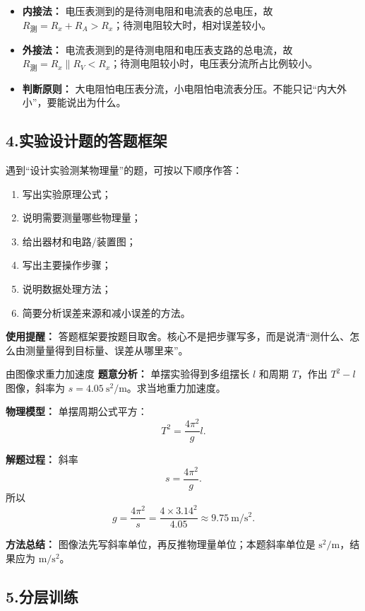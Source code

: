 \begin{itemize}
  \item \textbf{内接法：} 电压表测到的是待测电阻和电流表的总电压，故 $R_{\text{测}}=R_x+R_A>R_x$；待测电阻较大时，相对误差较小。
  \item \textbf{外接法：} 电流表测到的是待测电阻和电压表支路的总电流，故 $R_{\text{测}}=R_x\parallel R_V<R_x$；待测电阻较小时，电压表分流所占比例较小。
  \item \textbf{判断原则：} 大电阻怕电压表分流，小电阻怕电流表分压。不能只记“内大外小”，要能说出为什么。
\end{itemize}

\subsection*{4.\quad 实验设计题的答题框架}

遇到“设计实验测某物理量”的题，可按以下顺序作答：
\begin{enumerate}
  \item 写出实验原理公式；
  \item 说明需要测量哪些物理量；
  \item 给出器材和电路/装置图；
  \item 写出主要操作步骤；
  \item 说明数据处理方法；
  \item 简要分析误差来源和减小误差的方法。
\end{enumerate}

\textbf{使用提醒：} 答题框架要按题目取舍。核心不是把步骤写多，而是说清“测什么、怎么由测量量得到目标量、误差从哪里来”。

\begin{examplebox}{由图像求重力加速度}
\textbf{题意分析：} 单摆实验得到多组摆长 $l$ 和周期 $T$，作出 $T^2-l$ 图像，斜率为 $s=4.05\ \mathrm{s^2/m}$。求当地重力加速度。

\textbf{物理模型：} 单摆周期公式平方：
\[
T^2=\frac{4\pi^2}{g}l.
\]

\textbf{解题过程：}
斜率
\[
s=\frac{4\pi^2}{g}.
\]
所以
\[
g=\frac{4\pi^2}{s}
=\frac{4\times3.14^2}{4.05}
\approx9.75\ \mathrm{m/s^2}.
\]

\textbf{方法总结：} 图像法先写斜率单位，再反推物理量单位；本题斜率单位是 $\mathrm{s^2/m}$，结果应为 $\mathrm{m/s^2}$。
\end{examplebox}

\subsection*{5.\quad 分层训练}

